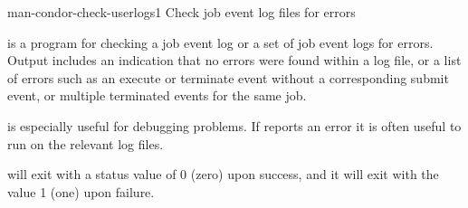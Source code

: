 \begin{ManPage}{}{man-condor-check-userlogs}{1}
{Check job event log files for errors}


\Synopsis {}

\Description

 is a program for checking a job event log or
a set of job event logs for errors.  
Output includes an indication that no errors were found
within a log file,
or a list of errors such as an
execute or terminate event without a corresponding submit event,
or multiple terminated events for the same job.

 is especially useful for debugging
 problems.  If  reports an error
it is often useful to run  on the relevant
log files.

\ExitStatus

 will exit with a status value of 0 (zero)
upon success, and it will exit with the value 1 (one) upon failure.

\end{ManPage}

